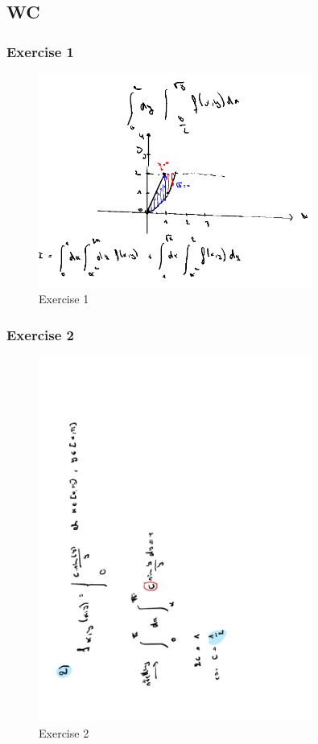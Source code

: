 \documentclass[a4paper]{report}
\begin{document}


\subsection{WC}

\subsubsection{Exercise 1}

\begin{figure}[H]
	\centering
	\includegraphics[width=0.8\textwidth]{assets/wc_5_ex_1.png}
	\caption{Exercise 1}
	\label{fig:wc_5_ex_1}
\end{figure}

\subsubsection{Exercise 2}

\begin{figure}[H]
	\centering
	\includegraphics[angle=-90, width=0.8\textwidth]{assets/wc_5_ex_2.pdf}
	\caption{Exercise 2}
\end{figure}
\end{document}
